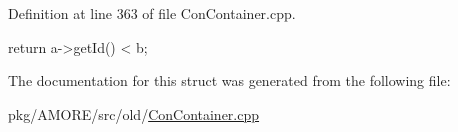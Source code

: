 Definition at line 363 of file ConContainer.cpp.


\begin{DoxyCode}
  {
    return a->getId() < b;
  }
\end{DoxyCode}


The documentation for this struct was generated from the following file:\begin{DoxyCompactItemize}
\item 
pkg/AMORE/src/old/\hyperlink{_con_container_8cpp}{ConContainer.cpp}\end{DoxyCompactItemize}
